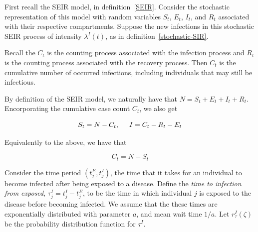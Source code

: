 \documentclass[12pt]{article}
\begin{document}
First recall the SEIR model, in definition~\ref{SEIR}. Consider the stochastic representation of this  model with random variables $S_t$, $E_t$, $I_t$, and $R_t$ associated with their respective compartments. Suppose the new infections in this stochastic SEIR process of intensity $\lambda^I(t)$, as in definition~\ref{stochastic-SIR}.

Recall the $C_t$ is the counting process associated with the infection process and $R_t$ is the counting process associated with the recovery process. Then $C_t$ is the cumulative number of occurred infections, including individuals that may still be infectious. 

By definition of the SEIR model, we naturally have that $N = S_t + E_t + I_t + R_t$. Encorporating the cumulative case count $C_t$, we also get

\[
S_t = N - C_t, \hspace* {5mm}
I = C_t - R_t  - E_t
\]

Equivalently to the above, we have that

\[
C_t = N - S_t
\]





Consider the time period $(t_j^E, t_j^I)$, the time that it takes for an individual to become infected after being exposed to a disease. Define the \textit{time to infection from exposed}, $\tau_j^{I} = t_j^I - t_j^E$, to be the time in which individual $j$ is exposed to the disease before becoming infected. We assume that the these times are exponentially distributed with parameter $a$, and mean wait time $1/a$. Let $r_\tau^{I}(\zeta)$ be the probability distribution function for $\tau^I$. 
\end{document}
